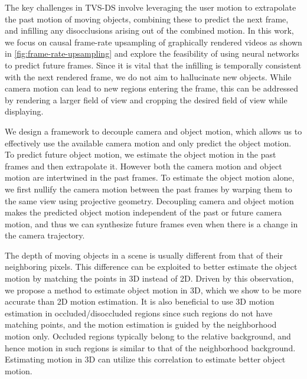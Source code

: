 \documentclass[preprint]{vgtc}
\begin{document}
    The key challenges in TVS-DS involve leveraging the user motion to extrapolate the past motion of moving objects, combining these to predict the next frame, and infilling any disocclusions arising out of the combined motion.
    In this work, we focus on causal frame-rate upsampling of graphically rendered videos as shown in \autoref{fig:frame-rate-upsampling} and explore the feasibility of using neural networks to predict future frames.
    Since it is vital that the infilling is temporally consistent with the next rendered frame, we do not aim to hallucinate new objects.
    While camera motion can lead to new regions entering the frame, this can be addressed by rendering a larger field of view and cropping the desired field of view while displaying.

We design a framework to decouple camera and object motion, which allows us to effectively use the available camera motion and only predict the object motion.
    To predict future object motion, we estimate the object motion in the past frames and then extrapolate it.
    However both the camera motion and object motion are intertwined in the past frames.
    To estimate the object motion alone, we first nullify the camera motion between the past frames by warping them to the same view using projective geometry.
    Decoupling camera and object motion makes the predicted object motion independent of the past or future camera motion, and thus we can synthesize future frames even when there is a change in the camera trajectory.

    The depth of moving objects in a scene is usually different from that of their neighboring pixels.
    This difference can be exploited to better estimate the object motion by matching the points in 3D instead of 2D\@.
    Driven by this observation, we propose a method to estimate object motion in 3D, which we show to be more accurate than 2D motion estimation.
It is also beneficial to use 3D motion estimation in occluded/disoccluded regions since such regions do not have matching points, and the motion estimation is guided by the neighborhood motion only.
    Occluded regions typically belong to the relative background, and hence motion in such regions is similar to that of the neighborhood background.
    Estimating motion in 3D can utilize this correlation to estimate better object motion.
    
\end{document}
